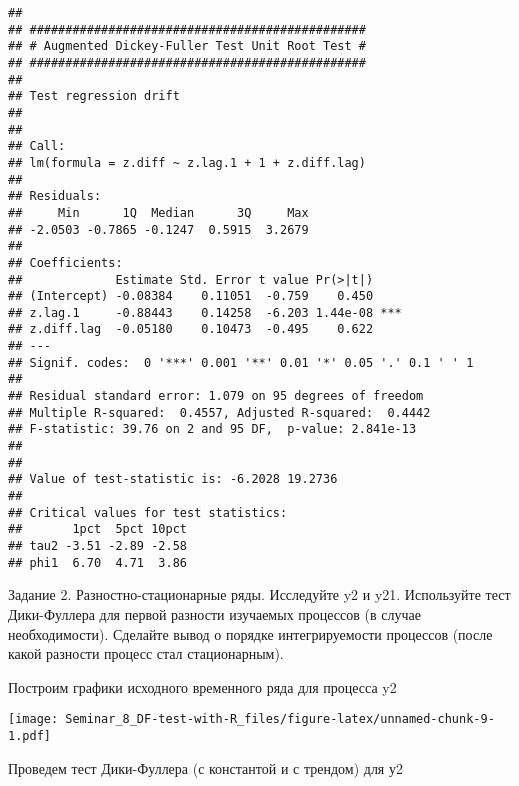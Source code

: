 \documentclass[
]{article}
\newenvironment{Shaded}{\begin{snugshade}}{\end{snugshade}}
\newcommand{\AttributeTok}[1]{\textcolor[rgb]{0.13,0.29,0.53}{#1}}
\newcommand{\FunctionTok}[1]{\textcolor[rgb]{0.13,0.29,0.53}{\textbf{#1}}}
\newcommand{\NormalTok}[1]{#1}
\newcommand{\SpecialCharTok}[1]{\textcolor[rgb]{0.81,0.36,0.00}{\textbf{#1}}}
\newcommand{\StringTok}[1]{\textcolor[rgb]{0.31,0.60,0.02}{#1}}
\begin{document}
\begin{verbatim}
## 
## ############################################### 
## # Augmented Dickey-Fuller Test Unit Root Test # 
## ############################################### 
## 
## Test regression drift 
## 
## 
## Call:
## lm(formula = z.diff ~ z.lag.1 + 1 + z.diff.lag)
## 
## Residuals:
##     Min      1Q  Median      3Q     Max 
## -2.0503 -0.7865 -0.1247  0.5915  3.2679 
## 
## Coefficients:
##             Estimate Std. Error t value Pr(>|t|)    
## (Intercept) -0.08384    0.11051  -0.759    0.450    
## z.lag.1     -0.88443    0.14258  -6.203 1.44e-08 ***
## z.diff.lag  -0.05180    0.10473  -0.495    0.622    
## ---
## Signif. codes:  0 '***' 0.001 '**' 0.01 '*' 0.05 '.' 0.1 ' ' 1
## 
## Residual standard error: 1.079 on 95 degrees of freedom
## Multiple R-squared:  0.4557, Adjusted R-squared:  0.4442 
## F-statistic: 39.76 on 2 and 95 DF,  p-value: 2.841e-13
## 
## 
## Value of test-statistic is: -6.2028 19.2736 
## 
## Critical values for test statistics: 
##       1pct  5pct 10pct
## tau2 -3.51 -2.89 -2.58
## phi1  6.70  4.71  3.86
\end{verbatim}

Задание 2. Разностно-стационарные ряды. Исследуйте y2 и y21. Используйте
тест Дики-Фуллера для первой разности изучаемых процессов (в случае
необходимости). Сделайте вывод о порядке интегрируемости процессов
(после какой разности процесс стал стационарным).

Построим графики исходного временного ряда для процесса y2

\begin{Shaded}
\end{Shaded}

\texttt{[image: Seminar\_8\_DF-test-with-R\_files/figure-latex/unnamed-chunk-9-1.pdf]}

Проведем тест Дики-Фуллера (с константой и с трендом) для у2

\begin{Shaded}
\end{Shaded}
\end{document}
